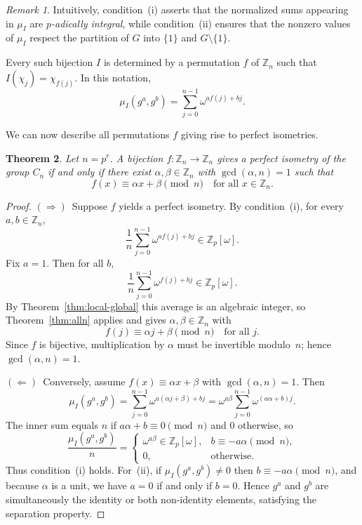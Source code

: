 \documentclass[11pt]{amsart}
\newtheorem{thm}{Theorem}[section]
\theoremstyle{definition}
\theoremstyle{remark}
\newtheorem{rem}[thm]{Remark}
\numberwithin{equation}{section}
\begin{document}
\begin{rem}
	Intuitively, condition~(i) asserts that the normalized sums appearing in $\mu_I$
	are \emph{$p$-adically integral}, while condition~(ii) ensures that the nonzero values of
	$\mu_I$ respect the partition of $G$ into $\{1\}$ and $G\setminus\{1\}$.
\end{rem}

Every such bijection $I$ is determined by a permutation $f$ of $\mathbb{Z}_n$
such that $I(\chi_j) = \chi_{f(j)}$.  In this notation,
\[
	\mu_I(g^a,g^b) = \sum_{j=0}^{n-1} \omega^{a f(j) + bj}.
\]

We can now describe all permutations $f$ giving rise to perfect isometries.

\begin{thm}\label{thm:perfect}
	Let $n=p^r$.  A bijection $f : \mathbb{Z}_n \to \mathbb{Z}_n$ gives a perfect
	isometry of the group $C_n$ if and only if there exist $\alpha,\beta \in \mathbb{Z}_n$
	with $\gcd(\alpha,n)=1$ such that
	\[
		f(x) \equiv \alpha x + \beta \pmod n \quad \text{for all } x\in\mathbb{Z}_n.
	\]
\end{thm}

\begin{proof}
	$(\Rightarrow)$\ Suppose $f$ yields a perfect isometry.  By condition~(i),
	for every $a,b\in\mathbb{Z}_n$,
	\[
		\frac{1}{n}\sum_{j=0}^{n-1}\omega^{a f(j)+bj} \in \mathbb{Z}_p[\omega].
	\]
	Fix $a=1$.  Then for all $b$,
	\[
		\frac{1}{n}\sum_{j=0}^{n-1}\omega^{f(j)+bj} \in \mathbb{Z}_p[\omega].
	\]
	By Theorem~\ref{thm:local-global} this average is an algebraic integer, so Theorem~\ref{thm:alln} applies and gives $\alpha,\beta\in\mathbb{Z}_n$ with
	\[
		f(j)\equiv \alpha j + \beta \pmod n \quad\text{for all }j.
	\]
	Since $f$ is bijective, multiplication by $\alpha$ must be invertible modulo~$n$;
	hence $\gcd(\alpha,n)=1$.

	$(\Leftarrow)$\ Conversely, assume $f(x)\equiv \alpha x+\beta$ with
	$\gcd(\alpha,n)=1$.  Then
	\[
		\mu_I(g^a,g^b)
		= \sum_{j=0}^{n-1}\omega^{a(\alpha j+\beta)+bj}
		= \omega^{a\beta}\sum_{j=0}^{n-1}\omega^{(a\alpha+b)j}.
	\]
	The inner sum equals $n$ if $a\alpha+b\equiv0\pmod n$ and $0$ otherwise, so
	\[
		\frac{\mu_I(g^a,g^b)}{n}
		= \begin{cases}
			\omega^{a\beta}\in \mathbb{Z}_p[\omega], & b\equiv -a\alpha \pmod n, \\[4pt]
			0,                                       & \text{otherwise}.
		\end{cases}
	\]
	Thus condition~(i) holds.  For~(ii), if $\mu_I(g^a,g^b)\ne0$ then
	$b\equiv -a\alpha\pmod n$, and because $\alpha$ is a unit, we have
	$a=0$ if and only if $b=0$.  Hence $g^a$ and $g^b$ are simultaneously
	the identity or both non-identity elements, satisfying the separation property.
\end{proof}
\end{document}
